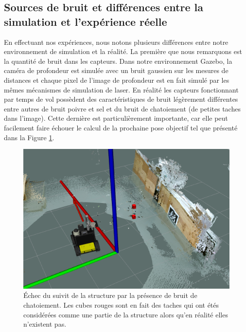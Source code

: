 \subsection{Sources de bruit et différences entre la simulation et l'expérience réelle}

En effectuant nos expériences, nous notons plusieurs différences entre notre environnement de simulation et la réalité. La première que nous remarquons est la quantité de bruit dans les capteurs. Dans notre environnement Gazebo, la caméra de profondeur est simulée avec un bruit gaussien sur les mesures de distances et chaque pixel de l'image de profondeur est en fait simulé par les mêmes mécanismes de simulation de laser. En réalité les capteurs fonctionnant par temps de vol possèdent des caractéristiques de bruit légèrement différentes entre autres de bruit poivre et sel et du bruit de chatoiement (de petites taches dans l'image). Cette dernière est particulièrement importante, car elle peut facilement faire échouer le calcul de la prochaine pose objectif tel que présenté dans la Figure \ref{fig:speckle_fail}.

\begin{figure}[!th]
  \centering
  \includegraphics[width=0.7\linewidth]{images/speckle.png}
  \caption{Échec du suivit de la structure par la présence de bruit de chatoiement. Les cubes rouges sont en fait des taches qui ont étés considérées comme une partie de la structure alors qu'en réalité elles n'existent pas.}
  \label{fig:speckle_fail}
\end{figure}

